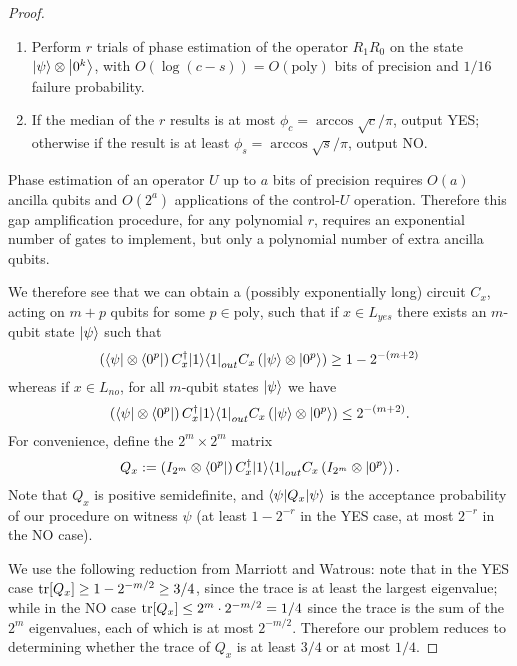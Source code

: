 \documentclass[english]{article}
\numberwithin{equation}{section}
\numberwithin{figure}{section}
\theoremstyle{plain}
\theoremstyle{definition}
\theoremstyle{plain}
\theoremstyle{definition}
\theoremstyle{remark}
\theoremstyle{remark}
\theoremstyle{plain}
\begin{document}
\begin{proof}
\begin{enumerate}
\item Perform $r$ trials of phase estimation of the operator $R_1R_0$ on the state ${\left\vert{\psi}\right\rangle}\otimes {\left\vert{0^k}\right\rangle}$, with $O(\log(c-s)) = O(\text{poly})$ bits of precision and $1/16$ failure probability. 
\item If the median of the $r$ results is at most $\phi_c = \arccos\sqrt{c}/\pi$, output YES; otherwise if the result is at least $\phi_s = \arccos\sqrt{s}/\pi$, output NO.
\end{enumerate}

Phase estimation of an operator $U$ up to $a$ bits of precision requires $O(a)$ ancilla qubits and $O(2^a)$ applications of the control-$U$ operation. Therefore this gap amplification procedure, for any polynomial $r$, requires an exponential number of gates to implement, but only a polynomial number of extra ancilla qubits.

We therefore see that we can obtain a (possibly exponentially long) circuit $C_x$, acting on $m+p$ qubits for some $p \in \text{poly}$, such that if $x \in L_{yes}$ there exists an $m$-qubit state ${\left\vert{\psi}\right\rangle}$ such that
\begin{equation}
\left({\left\langle{\psi}\right\vert}\otimes {\left\langle{0^p}\right\vert}\right) C^\dagger_x {\left\vert{1}\right\rangle}{\left\langle{1}\right\vert}_{out} C_x \left({\left\vert{\psi}\right\rangle}\otimes {\left\vert{0^p}\right\rangle}\right) \ge 1-2^{-(m+2)}
\end{equation}
whereas if $x \in L_{no}$, for all $m$-qubit states ${\left\vert{\psi}\right\rangle}$ we have
\begin{equation}
\left({\left\langle{\psi}\right\vert}\otimes {\left\langle{0^p}\right\vert}\right) C^\dagger_x {\left\vert{1}\right\rangle}{\left\langle{1}\right\vert}_{out} C_x \left({\left\vert{\psi}\right\rangle}\otimes {\left\vert{0^p}\right\rangle}\right) \le 2^{-(m+2)}.
\end{equation}
For convenience, define the $2^m \times 2^m$ matrix
\begin{equation}
Q_x := \left(I_{2^m}\otimes {\left\langle{0^p}\right\vert}\right) C^\dagger_x {\left\vert{1}\right\rangle}{\left\langle{1}\right\vert}_{out} C_x \left(I_{2^m}\otimes {\left\vert{0^p}\right\rangle}\right).
\end{equation}
Note that $Q_x$ is positive semidefinite, and ${\left\langle{\psi}\right\vert}Q_x{\left\vert{\psi}\right\rangle}$ is the acceptance probability of our procedure on witness $\psi$ (at least $1-2^{-r}$ in the YES case, at most $2^{-r}$ in the NO case).

We use the following reduction from Marriott and Watrous: note that in the YES case $\operatorname{tr}[Q_x]\ge 1 - 2^{-m/2} \ge 3/4$, since the trace is at least the largest eigenvalue; while in the NO case $\operatorname{tr}[Q_x]\le 2^m \cdot 2^{-m/2} =1/4$ since the trace is the sum of the $2^m$ eigenvalues, each of which is at most $2^{-m/2}$. Therefore our problem reduces to determining whether the trace of $Q_x$ is at least $3/4$ or at most $1/4$.


\end{proof}
\end{document}
